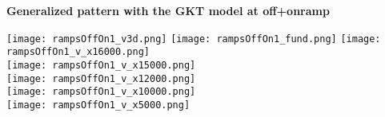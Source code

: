 \documentclass[a4paper,12pt]{scrartcl}
\begin{document}
\begin{center}

{\Large\sf\textbf{Generalized pattern with the GKT model at off+onramp}}


\hspace*{-40mm}
\texttt{[image: rampsOffOn1\_v3d.png]}
\hspace*{-5mm}
\texttt{[image: rampsOffOn1\_fund.png]}
\texttt{[image: rampsOffOn1\_v\_x16000.png]} \\[-2mm]
\texttt{[image: rampsOffOn1\_v\_x15000.png]} \\[-2mm]
\texttt{[image: rampsOffOn1\_v\_x12000.png]} \\[-2mm]
\texttt{[image: rampsOffOn1\_v\_x10000.png]} \\[-2mm]
\texttt{[image: rampsOffOn1\_v\_x5000.png]}
\end{center}





\end{document}
